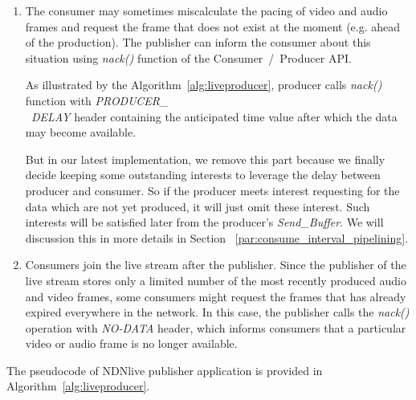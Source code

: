 \begin{enumerate}
	\item The consumer may sometimes miscalculate the pacing of video and audio frames and request the frame that does not exist at the moment (e.g. ahead of the production). The publisher can inform the consumer about this situation using \textit{nack()} function of the Consumer~/~Producer API. 

	As illustrated by the Algorithm~\ref{alg:liveproducer}, producer calls \textit{nack()} function with \textit{PRODUCER\_ \\\ DELAY} header containing the anticipated time value after which the data may become available.

	But in our latest implementation, we remove this part because we finally decide keeping some outstanding interests to leverage the delay between producer and consumer. So if the producer meets interest requesting for the data which are not yet produced, it will just omit these interest. Such interests will be satisfied later from the producer's \textit{Send\_Buffer}. We will discussion this in more details in Section~ \ref{par:consume_interval_pipelining}.
	
	\item Consumers join the live stream after the publisher. Since the publisher of the live stream stores only a limited number of the most recently produced audio and video frames, some consumers might request the frames that has already expired everywhere in the network. In this case, the publisher calls the \textit{nack()} operation with \textit{NO-DATA} header, which informs consumers that a particular video or audio frame is no longer available.
	
\end{enumerate}

The pseudocode of NDNlive publisher application is provided in Algorithm~\ref{alg:liveproducer}.

